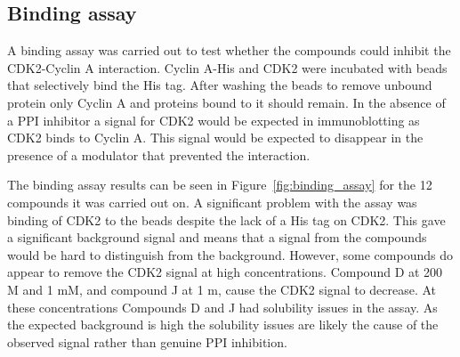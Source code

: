 \begin{figure}


\end{figure}


\subsection{Binding assay}

A binding assay was carried out to test whether the compounds could inhibit the CDK2-Cyclin A interaction.
Cyclin A-His and CDK2 were incubated with beads that selectively bind the His tag.
After washing the beads to remove unbound protein only Cyclin A and proteins bound to it should remain.
In the absence of a PPI inhibitor a signal for CDK2 would be expected in immunoblotting as CDK2 binds to Cyclin A.
This signal would be expected to disappear in the presence of a modulator that prevented the interaction.

The binding assay results can be seen in Figure~\ref{fig:binding_assay} for the 12 compounds it was carried out on.
A significant problem with the assay was binding of CDK2 to the beads despite the lack of a His tag on CDK2.
This gave a significant background signal and means that a signal from the compounds would be hard to distinguish from the background.
However, some compounds do appear to remove the CDK2 signal at high concentrations.
Compound D at 200 \textmu M and 1 mM, and compound J at 1 m, cause the CDK2 signal to decrease.
At these concentrations Compounds D and J had solubility issues in the assay.
As the expected background is high the solubility issues are likely the cause of the observed signal rather than genuine PPI inhibition.

